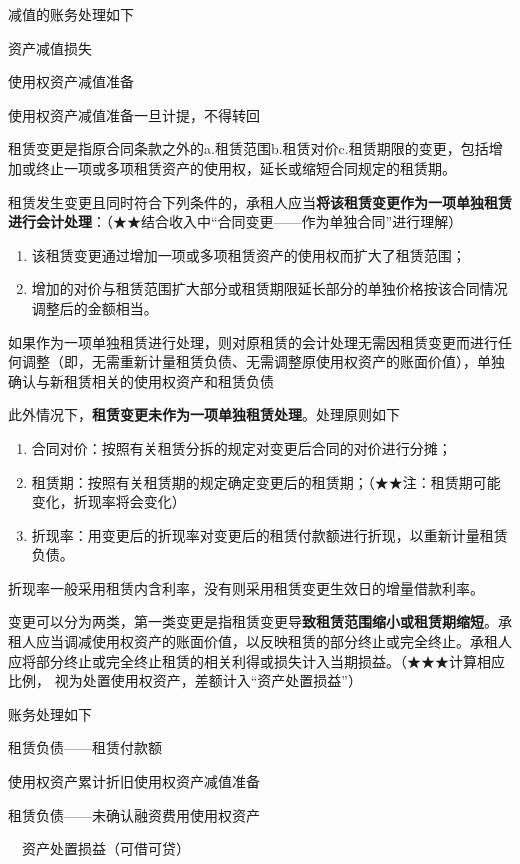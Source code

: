 \documentclass[UTF8,12pt]{ctexart}
\newenvironment{Dr}{%
	\begin{list}{}%
		{
			\setlength{\leftmargin}{2em}
			\setlength{\labelwidth}{2em}
			\setlength{\labelsep}{0pt}
			\setlength{\itemindent}{0pt}
			\setlength{\listparindent}{0pt}
			\setlength{\parsep}{0pt}
			\setlength{\topsep}{0pt}
		}
		\item[\textbf{借：}]
	}{%
	\end{list}
}
\newenvironment{Cr}{%
	\begin{list}{}%
		{
			\setlength{\leftmargin}{3em}
			\setlength{\labelwidth}{2em}
			\setlength{\labelsep}{0pt}
			\setlength{\itemindent}{0pt}
			\setlength{\listparindent}{0pt}
			\setlength{\parsep}{0pt}
			\setlength{\topsep}{0pt}
		}
		\item[\textbf{贷：}]
	}{%
	\end{list}
}
\numberwithin{equation}{section} %
\numberwithin{figure}{section}
\numberwithin{table}{section}
\begin{document}
	减值的账务处理如下
	
	\begin{Dr}
		资产减值损失
	\end{Dr}
	\begin{Cr}
		使用权资产减值准备
	\end{Cr}
	使用权资产减值准备一旦计提，不得转回
	
	租赁变更是指原合同条款之外的a.租赁范围b.租赁对价c.租赁期限的变更，包括增加或终止一项或多项租赁资产的使用权，延长或缩短合同规定的租赁期。
	
	租赁发生变更且同时符合下列条件的，承租人应当\textbf{将该租赁变更作为一项单独租赁进行会计处理}：（★★结合收入中“合同变更——作为单独合同”进行理解）
	\begin{enumerate}
		\item 该租赁变更通过增加一项或多项租赁资产的使用权而扩大了租赁范围；
		
		\item 增加的对价与租赁范围扩大部分或租赁期限延长部分的单独价格按该合同情况调整后的金额相当。
	\end{enumerate}

	如果作为一项单独租赁进行处理，则对原租赁的会计处理无需因租赁变更而进行任何调整（即，无需重新计量租赁负债、无需调整原使用权资产的账面价值），单独确认与新租赁相关的使用权资产和租赁负债
	
	此外情况下，\textbf{租赁变更未作为一项单独租赁处理}。处理原则如下
	\begin{enumerate}
		\item 合同对价：按照有关租赁分拆的规定对变更后合同的对价进行分摊；
		
		\item 租赁期：按照有关租赁期的规定确定变更后的租赁期；（★★注：租赁期可能变化，折现率将会变化）
		
		\item 折现率：用变更后的折现率对变更后的租赁付款额进行折现，以重新计量租赁负债。
	\end{enumerate}
	折现率一般采用租赁内含利率，没有则采用租赁变更生效日的增量借款利率。
	
	变更可以分为两类，第一类变更是指租赁变更导\textbf{致租赁范围缩小或租赁期缩短}。承租人应当调减使用权资产的账面价值，以反映租赁的部分终止或完全终止。承租人应将部分终止或完全终止租赁的相关利得或损失计入当期损益。（★★★计算相应比例， 视为处置使用权资产，差额计入“资产处置损益”）
	
	账务处理如下
	
	\begin{Dr}
		租赁负债——租赁付款额
		
		使用权资产累计折旧使用权资产减值准备
	\end{Dr}
	\begin{Cr}
		租赁负债——未确认融资费用使用权资产
		
		\ \ 资产处置损益（可借可贷）
	\end{Cr}
	
\end{document}
